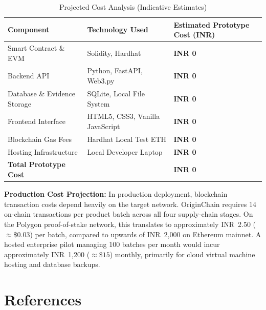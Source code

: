 \documentclass[12pt,a4paper]{report}
\begin{document}
\begin{table}[H]
\centering
\caption{Projected Cost Analysis (Indicative Estimates)}
\label{tab:cost}
\small
\renewcommand{\arraystretch}{1.22}
\begin{tabularx}{\textwidth}{L{4.5cm} L{4.5cm} Y}
\toprule
\textbf{Component} & \textbf{Technology Used} & \textbf{Estimated Prototype Cost (INR)} \\
\midrule
Smart Contract \& EVM & Solidity, Hardhat & \textbf{INR 0} \\
Backend API & Python, FastAPI, Web3.py & \textbf{INR 0} \\
Database \& Evidence Storage & SQLite, Local File System & \textbf{INR 0} \\
Frontend Interface & HTML5, CSS3, Vanilla JavaScript & \textbf{INR 0} \\
Blockchain Gas Fees & Hardhat Local Test ETH & \textbf{INR 0} \\
Hosting Infrastructure & Local Developer Laptop & \textbf{INR 0} \\
\midrule
\textbf{Total Prototype Cost} & & \textbf{INR 0} \\
\bottomrule
\end{tabularx}
\end{table}

\noindent \textbf{Production Cost Projection:}
In production deployment, blockchain transaction costs depend heavily on the target network. OriginChain requires 14 on-chain transactions per product batch across all four supply-chain stages. On the Polygon proof-of-stake network, this translates to approximately INR~2.50 ($\approx \$0.03$) per batch, compared to upwards of INR~2,000 on Ethereum mainnet. A hosted enterprise pilot managing 100 batches per month would incur approximately INR~1,200 ($\approx \$15$) monthly, primarily for cloud virtual machine hosting and database backups.

\chapter{References}
\label{chap:references}

\makeatletter
\renewenvironment{thebibliography}[1]
     {\list{\@biblabel{\@arabic\c@enumiv}}%
           {\settowidth\labelwidth{\@biblabel{#1}}%
            \leftmargin\labelwidth
            \advance\leftmargin\labelsep
            \@openbib@code
            \usecounter{enumiv}%
            \let\p@enumiv\@empty
            \renewcommand\theenumiv{\@arabic\c@enumiv}}%
      \sloppy
      \clubpenalty4000
      \@clubpenalty \clubpenalty
      \widowpenalty4000%
      \sfcode`\.\@m}
     {\def\@noitemerr
       {\@latex@warning{Empty `thebibliography' environment}}%
      \endlist}
\makeatother
\end{document}
